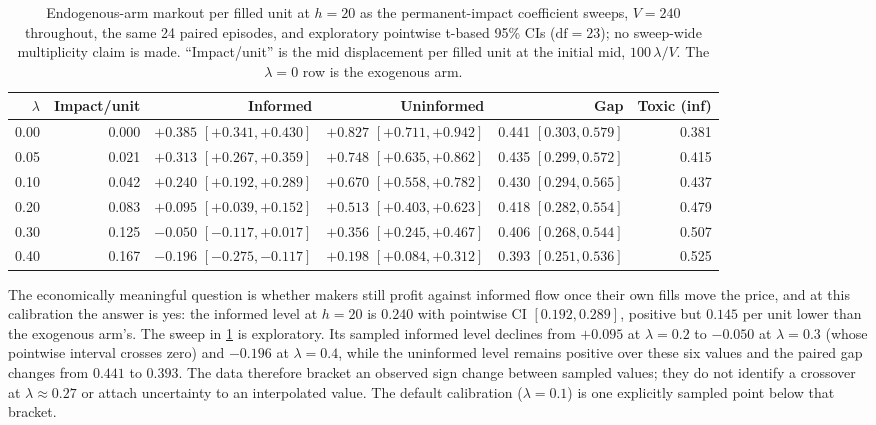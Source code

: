 \begin{table}[t]
\centering
\caption{Endogenous-arm markout per filled unit at $h = 20$ as the permanent-impact coefficient sweeps, $V = 240$ throughout, the same 24 paired episodes, and exploratory pointwise t-based 95\% CIs ($\mathrm{df}=23$); no sweep-wide multiplicity claim is made. ``Impact/unit'' is the mid displacement per filled unit at the initial mid, $100\,\lambda/V$. The $\lambda = 0$ row is the exogenous arm.}
\label{tab:f6-endo-sweep}
\footnotesize
\setlength{\tabcolsep}{3.5pt}
\begin{tabular}{rrrrrr}
\toprule
$\lambda$ & Impact/unit & Informed & Uninformed & Gap & Toxic (inf) \\
\midrule
0.00 & 0.000 & $+0.385$ $[+0.341, +0.430]$ & $+0.827$ $[+0.711, +0.942]$ & 0.441 $[0.303, 0.579]$ & 0.381 \\
0.05 & 0.021 & $+0.313$ $[+0.267, +0.359]$ & $+0.748$ $[+0.635, +0.862]$ & 0.435 $[0.299, 0.572]$ & 0.415 \\
0.10 & 0.042 & $+0.240$ $[+0.192, +0.289]$ & $+0.670$ $[+0.558, +0.782]$ & 0.430 $[0.294, 0.565]$ & 0.437 \\
0.20 & 0.083 & $+0.095$ $[+0.039, +0.152]$ & $+0.513$ $[+0.403, +0.623]$ & 0.418 $[0.282, 0.554]$ & 0.479 \\
0.30 & 0.125 & $-0.050$ $[-0.117, +0.017]$ & $+0.356$ $[+0.245, +0.467]$ & 0.406 $[0.268, 0.544]$ & 0.507 \\
0.40 & 0.167 & $-0.196$ $[-0.275, -0.117]$ & $+0.198$ $[+0.084, +0.312]$ & 0.393 $[0.251, 0.536]$ & 0.525 \\
\bottomrule
\end{tabular}
\end{table}

The economically meaningful question is whether makers still profit against informed flow once their own fills move the price, and at this calibration the answer is yes: the informed level at $h = 20$ is $0.240$ with pointwise CI $[0.192, 0.289]$, positive but $0.145$ per unit lower than the exogenous arm's. The sweep in \cref{tab:f6-endo-sweep} is exploratory. Its sampled informed level declines from $+0.095$ at $\lambda=0.2$ to $-0.050$ at $\lambda=0.3$ (whose pointwise interval crosses zero) and $-0.196$ at $\lambda=0.4$, while the uninformed level remains positive over these six values and the paired gap changes from $0.441$ to $0.393$. The data therefore bracket an observed sign change between sampled values; they do not identify a crossover at $\lambda\approx0.27$ or attach uncertainty to an interpolated value. The default calibration ($\lambda=0.1$) is one explicitly sampled point below that bracket.

